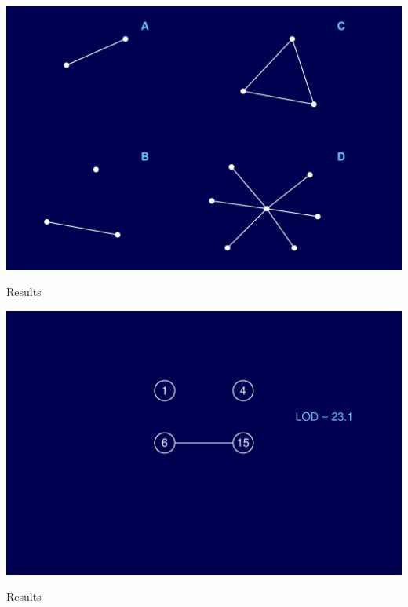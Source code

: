 \documentclass[12pt]{article}
\newcommand{\headsize}{\fontsize{35}{35} \selectfont}
\begin{document}
\centerline{\includegraphics{FigsB/models.pdf}}







\newpage

\headsize \color{myyellow}
\hfill \begin{minipage}{5.75in}
\centering
Results
\end{minipage}

\vfill


\centerline{\includegraphics{FigsB/hyper_models1.pdf}}



\newpage

\addtocounter{page}{-1}

\headsize \color{myyellow}
\hfill \begin{minipage}{5.75in}
\centering
Results
\end{minipage}
\end{document}
